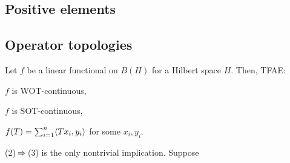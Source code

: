 \documentclass{../exp}
\begin{document}
\subsection{Positive elements}





\subsection{Operator topologies}

\begin{thm}
Let $f$ be a linear functional on $B(H)$ for a Hilbert space $H$.
Then, TFAE:
\begin{cond}
\item $f$ is WOT-continuous,
\item $f$ is SOT-continuous,
\item $f(T)=\sum_{i=1}^n\langle Tx_i,y_i\rangle$ for some $x_i,y_i$.
\end{cond}
\end{thm}
\begin{pf}
(2)$\impl$(3) is the only nontrivial implication.
Suppose
\end{pf}
\end{document}
